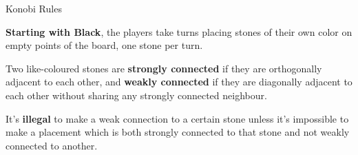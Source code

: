 \documentclass{beamer}
\begin{document}
  \begin{frame}{Konobi Rules}

    \textbf{Starting with Black}, the players take turns placing stones of their own color on empty points of the board, one stone per turn.\pause

    \vspace{1em}

    Two like-coloured stones are \textbf{strongly connected} if they are orthogonally adjacent to each other, and \textbf{weakly connected} if they are diagonally adjacent to each other without sharing any strongly connected neighbour.\pause

    \vspace{1em}

    It's \textbf{illegal} to make a weak connection to a certain stone unless it's impossible to make a placement which is both strongly connected to that stone and not weakly connected to another.

  \end{frame}
\end{document}

